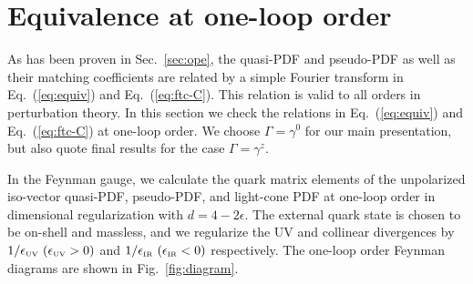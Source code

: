 \documentclass[prd,aps,twocolumn,preprintnumbers,showpacs,nofootinbib,superscriptaddress,notitlepage]{revtex4-1}
\begin{document}
\section{Equivalence at one-loop order}
\label{sec:equiv}

As has been proven in Sec.~\ref{sec:ope}, the quasi-PDF and pseudo-PDF as well as their matching coefficients are related by a simple Fourier transform in Eq.~(\ref{eq:equiv}) and Eq.~(\ref{eq:ftc-C}). This relation is valid to all orders in perturbation theory. In this section we check the relations in Eq.~(\ref{eq:equiv}) and Eq.~(\ref{eq:ftc-C}) at one-loop order. We choose $\Gamma=\gamma^0$ for our main presentation, but also quote final results for the case $\Gamma=\gamma^z$.

In the Feynman gauge, we calculate the quark matrix elements of the unpolarized iso-vector quasi-PDF, pseudo-PDF, and light-cone PDF at one-loop order in dimensional
regularization with $d=4-2\epsilon$. The external quark state is chosen to be on-shell and massless, and we regularize the UV and collinear divergences by $1/\epsilon_{\mbox{\tiny UV}}\ (\epsilon_{\mbox{\tiny UV}}>0)$ and $1/\epsilon_{\mbox{\tiny IR}}\ (\epsilon_{\mbox{\tiny IR}}<0)$ respectively. The one-loop order Feynman diagrams are shown in Fig.~\ref{fig:diagram}.
\end{document}
